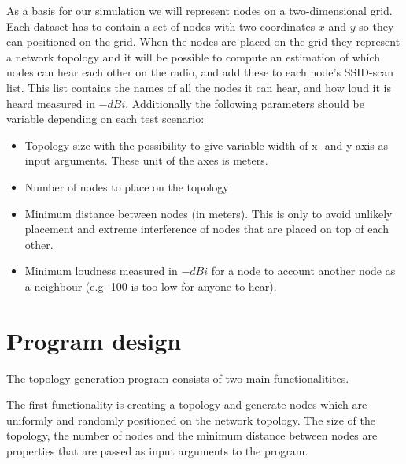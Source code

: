 As a basis for our simulation we will represent nodes on a two-dimensional grid. Each dataset has to contain a set of nodes with two coordinates $x$ and $y$ so they can
positioned on the grid. When the nodes are placed on the grid they represent a network topology
and it will be possible to compute an estimation of which nodes can hear each other on the radio, and add these to each node's SSID-scan list.
This list contains the names of all the nodes it can hear, and how loud it is heard measured in $-dBi$.
Additionally the following parameters should be variable depending on each test scenario:

\begin{itemize}
	\item Topology size with the possibility to give variable width of x- and y-axis as input arguments. These unit of the axes is meters.
	\item Number of nodes to place on the topology
	\item Minimum distance between nodes (in meters). This is only to avoid unlikely placement and extreme interference of nodes that are placed on top of each other. 
	\item Minimum loudness measured in $-dBi$ for a node to account another node as a neighbour (e.g -100 is too low for anyone to hear).
\end{itemize}


	\section{Program design}
	The topology generation program consists of two main functionalitites.

	The first functionality is creating a topology and generate nodes which are uniformly
	and randomly positioned on the network topology. The size of the topology, the number of nodes and the minimum distance
	between nodes are properties that are passed as input arguments to the program.


